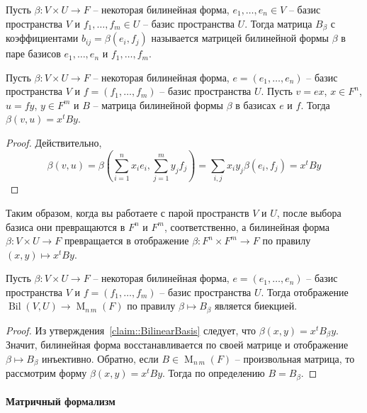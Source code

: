 \begin{definition}
Пусть $\beta\colon V\times U\to F$ -- некоторая билинейная форма,  $e_1,\ldots,e_n\in V$ -- базис пространства $V$ и $f_1,\ldots,f_m\in U$ -- базис пространства $U$.
Тогда матрица $B_\beta$ с коэффициентами $b_{ij} = \beta(e_i,f_j)$ называется матрицей билинейной формы $\beta$ в паре базисов $e_1,\ldots,e_n$ и $f_1,\ldots,f_m$.
\end{definition}

\begin{claim}
\label{claim::BilinearBasis}
Пусть $\beta\colon V\times U\to F$ -- некоторая билинейная форма,  $e = (e_1,\ldots,e_n)$ -- базис пространства $V$ и $f=(f_1,\ldots,f_m)$ -- базис пространства $U$.
Пусть $v = ex$, $x\in F^n$, $u =fy$, $y\in F^m$ и $B$ -- матрица билинейной формы $\beta$ в базисах $e$ и $f$.
Тогда $\beta(v,u) = x^t B y$.
\end{claim}
\begin{proof}
Действительно, 
\[
\beta(v,u) = \beta(\sum_{i=1}^n x_i e_i, \sum_{j=1}^m y_j f_j) = \sum_{i,j} x_iy_j\beta(e_i, f_j) = x^t B y
\]
\end{proof}

Таким образом, когда вы работаете с парой пространств $V$ и $U$, после выбора базиса они превращаются в $F^n$ и $F^m$, соответственно, а билинейная форма $\beta\colon V\times U\to F$ превращается в отображение $\beta\colon F^n \times F^m \to F$ по правилу $(x,y)\mapsto x^t B y$.

\begin{claim}
\label{claim::BilinearMatrices}
Пусть $\beta\colon V\times U\to F$ -- некоторая билинейная форма,  $e = (e_1,\ldots,e_n)$ -- базис пространства $V$ и $f=(f_1,\ldots,f_m)$ -- базис пространства $U$.
Тогда отображение $\operatorname{Bil}(V,U)\to \operatorname{M}_{n\,m}(F)$ по правилу $\beta\mapsto B_\beta$ является биекцией.
\end{claim}
\begin{proof}
Из утверждения~\ref{claim::BilinearBasis} следует, что $\beta(x,y) = x^t B_\beta y$.
Значит, билинейная форма восстанавливается по своей матрице и отображение $\beta\mapsto B_\beta$ инъективно.
Обратно, если $B\in \operatorname{M}_{n\,m}(F)$ -- произвольная матрица, то рассмотрим форму $\beta(x,y) = x^t B y$.
Тогда по определению $B = B_\beta$.
\end{proof}

\paragraph{Матричный формализм}

